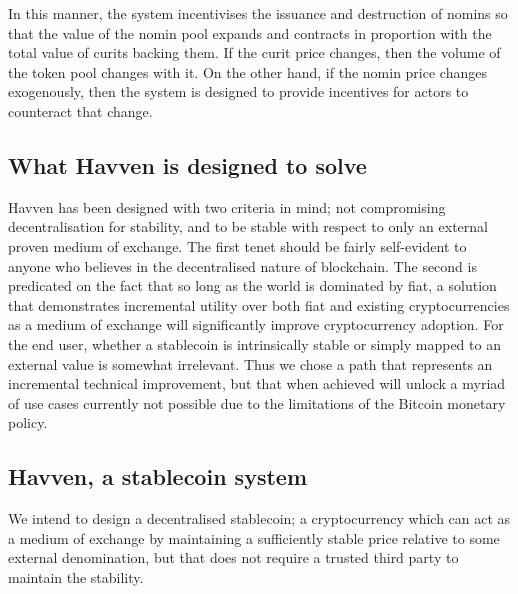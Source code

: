 In this manner, the system incentivises the issuance and destruction of nomins so that the value of
the nomin pool expands and contracts in proportion with the total value of curits backing them.
If the curit price changes, then the volume of the token pool changes with it.
On the other hand, if the nomin price changes exogenously, then the system is designed to provide
incentives for actors to counteract that change. \\

\subsection{What Havven is designed to solve}

\noindent Havven has been designed with two criteria in mind; not compromising decentralisation for stability,
and to be stable with respect to only an external proven medium of exchange.
The first tenet should be fairly self-evident to anyone who believes in the decentralised nature of blockchain.
The second is predicated on the fact that so long as the world is dominated by fiat, a solution that
demonstrates incremental utility over both fiat and existing cryptocurrencies as a medium of exchange will
significantly improve cryptocurrency adoption. For the end user, whether a stablecoin is intrinsically stable
or simply mapped to an external value is somewhat irrelevant.
Thus we chose a path that represents an incremental technical improvement, but that when achieved will
unlock a myriad of use cases currently not possible due to the limitations of the Bitcoin monetary policy. \\

\subsection{Havven, a stablecoin system}

\noindent We intend to design a decentralised stablecoin; a cryptocurrency which can act as a medium of
exchange by maintaining a sufficiently stable price relative to some external denomination,
but that does not require a trusted third party to maintain the stability.\\

